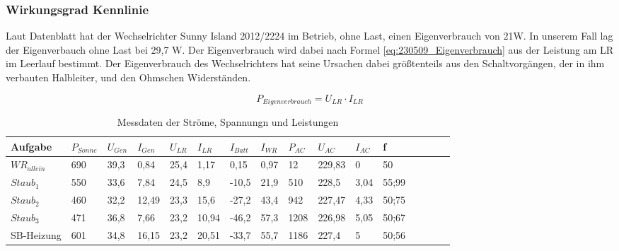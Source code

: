 \subsubsection{Wirkungsgrad Kennlinie}
Laut Datenblatt hat der Wechselrichter Sunny Island 2012/2224 im Betrieb, ohne Last, einen Eigenverbrauch von 21W. 
In unserem Fall lag der Eigenverbauch ohne Last bei 29,7 W. 
Der Eigenverbrauch wird dabei nach Formel \autoref{eq:230509_Eigenverbrauch} aus der Leistung am LR im Leerlauf bestimmt. 
Der Eigenverbrauch des Wechselrichters hat seine Ursachen dabei größtenteils aus den Schaltvorgängen, der in ihm verbauten Halbleiter, und den Ohmschen Widerständen.

\begin{equation}
	P_{ Eigenverbrauch }= U_{ LR} \cdot I_{ LR }
\label{eq:230509_Eigenverbrauch}
\end{equation} 


\begin{table}[!ht]
    \caption{Messdaten der Ströme, Spannungn und Leistungen }
	\centering
    \begin{tabular}{|l|l|l|l|l|l|l|l|l|l|l|l|l|l|l|l|}
    \hline
        Aufgabe & $P_{Sonne}$ & $U_{Gen}$ & $I_{Gen}$ & $U_{LR}$ & $I_{LR}$ & $I_{Batt}$ & $I_{WR}$ & $P_{AC}$ & $U_{AC}$ & $I_{AC}$ & f \\ \hline
        ${WR}_{allein}$ & 690 & 39,3 & 0,84 & 25,4 & 1,17 & 0,15 & 0,97 & 12 & 229,83 & 0 & 50 \\ \hline
        $Staub_{1}$ & 550 & 33,6 & 7,84 & 24,5 & 8,9 & -10,5 & 21,9 & 510 & 228,5 & 3,04 & 55;99  \\ \hline
        $Staub_{2}$ & 460 & 32,2 & 12,49 & 23,3 & 15,6 & -27,2 & 43,4 & 942 & 227,47 & 4,33 & 50;75 \\ \hline
        $Staub_{3}$ & 471 & 36,8 & 7,66 & 23,2 & 10,94 & -46,2 & 57,3 & 1208 & 226,98 & 5,05 & 50;67 \\ \hline
        SB-Heizung & 601 & 34,8 & 16,15 & 23,2 & 20,51 & -33,7 & 55,7 & 1186 & 227,4 & 5 & 50;56 \\ \hline
    \end{tabular}
	\label{tab:230512_Messtabelle}
\end{table}

